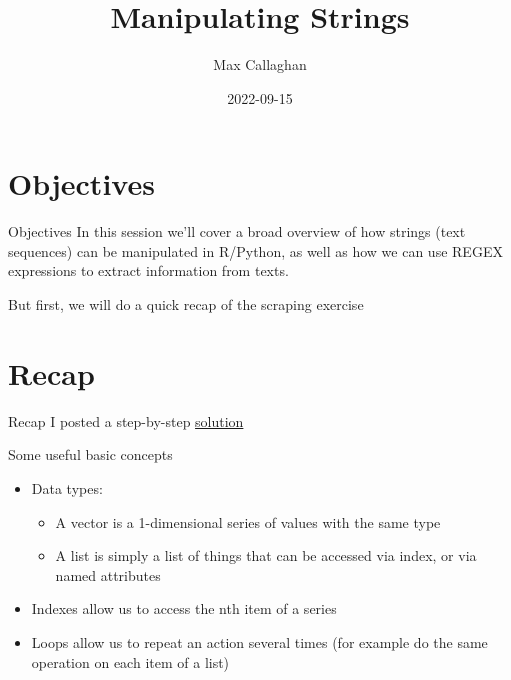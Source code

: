 \documentclass[
  10pt,
  ignorenonframetext,
  aspectratio=169]{beamer}
\title{Manipulating Strings}
\author{Max Callaghan}
\date{2022-09-15}
\providecommand{\tightlist}{%
  \setlength{\itemsep}{0pt}\setlength{\parskip}{0pt}}
\begin{document}
\frame{\titlepage}

\hypertarget{objectives}{%
\section{Objectives}\label{objectives}}

\begin{frame}{Objectives}
\protect\hypertarget{objectives-1}{}
In this session we'll cover a broad overview of how strings (text
sequences) can be manipulated in R/Python, as well as how we can use
REGEX expressions to extract information from texts.

\medskip

But first, we will do a quick recap of the scraping exercise
\end{frame}

\hypertarget{recap}{%
\section{Recap}\label{recap}}

\begin{frame}{Recap}
\protect\hypertarget{recap-1}{}
I posted a step-by-step \href{online}{solution}

Some useful basic concepts

\begin{itemize}
\tightlist
\item
  Data types:

  \begin{itemize}
  \tightlist
  \item
    A vector is a 1-dimensional series of values with the same type
  \item
    A list is simply a list of things that can be accessed via index, or
    via named attributes
  \end{itemize}
\item
  Indexes allow us to access the nth item of a series
\item
  Loops allow us to repeat an action several times (for example do the
  same operation on each item of a list)
\end{itemize}
\end{frame}
\end{document}
